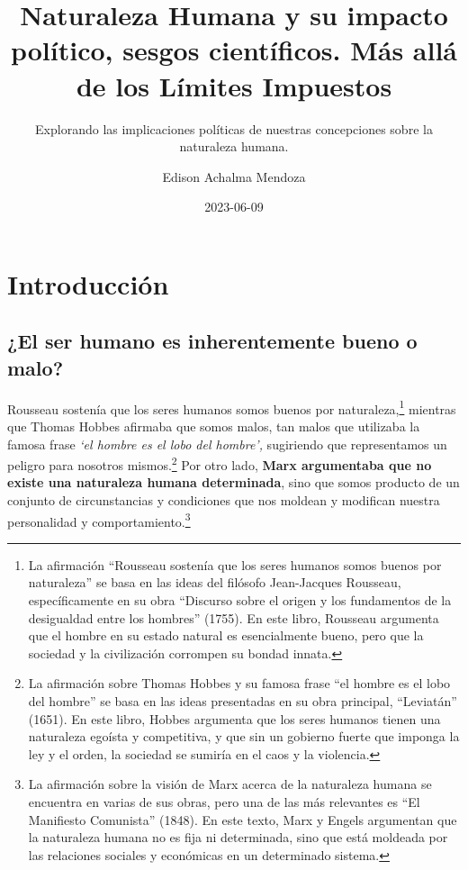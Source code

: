 \documentclass[
  letterpaper,
  DIV=11,
  numbers=noendperiod]{scrartcl}
\title{Naturaleza Humana y su impacto político, sesgos científicos. Más
allá de los Límites Impuestos}
\subtitle{Explorando las implicaciones políticas de nuestras
concepciones sobre la naturaleza humana.}
\author{Edison Achalma Mendoza}
\date{2023-06-09}
\begin{document}
\maketitle
\ifdefined\Shaded\renewenvironment{Shaded}{\begin{tcolorbox}[interior hidden, sharp corners, enhanced, frame hidden, borderline west={3pt}{0pt}{shadecolor}, boxrule=0pt, breakable]}{\end{tcolorbox}}\fi

\hypertarget{introducciuxf3n}{%
\section{Introducción}\label{introducciuxf3n}}

\hypertarget{el-ser-humano-es-inherentemente-bueno-o-malo}{%
\subsection{¿El ser humano es inherentemente bueno o
malo?}\label{el-ser-humano-es-inherentemente-bueno-o-malo}}

Rousseau sostenía que los seres humanos somos buenos por
naturaleza,\footnote{La afirmación ``Rousseau sostenía que los seres
  humanos somos buenos por naturaleza'' se basa en las ideas del
  filósofo Jean-Jacques Rousseau, específicamente en su obra ``Discurso
  sobre el origen y los fundamentos de la desigualdad entre los
  hombres'' (1755). En este libro, Rousseau argumenta que el hombre en
  su estado natural es esencialmente bueno, pero que la sociedad y la
  civilización corrompen su bondad innata.} mientras que Thomas Hobbes
afirmaba que somos malos, tan malos que utilizaba la famosa frase
\emph{`el hombre es el lobo del hombre',} sugiriendo que representamos
un peligro para nosotros mismos.\footnote{La afirmación sobre Thomas
  Hobbes y su famosa frase ``el hombre es el lobo del hombre'' se basa
  en las ideas presentadas en su obra principal, ``Leviatán'' (1651). En
  este libro, Hobbes argumenta que los seres humanos tienen una
  naturaleza egoísta y competitiva, y que sin un gobierno fuerte que
  imponga la ley y el orden, la sociedad se sumiría en el caos y la
  violencia.} Por otro lado, \textbf{Marx argumentaba que no existe una
naturaleza humana determinada}, sino que somos producto de un conjunto
de circunstancias y condiciones que nos moldean y modifican nuestra
personalidad y comportamiento.\footnote{La afirmación sobre la visión de
  Marx acerca de la naturaleza humana se encuentra en varias de sus
  obras, pero una de las más relevantes es ``El Manifiesto Comunista''
  (1848). En este texto, Marx y Engels argumentan que la naturaleza
  humana no es fija ni determinada, sino que está moldeada por las
  relaciones sociales y económicas en un determinado sistema.}
\end{document}
